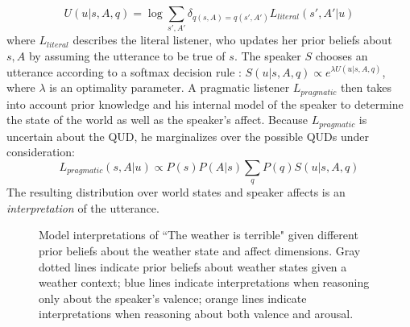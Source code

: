 \documentclass[10pt,letterpaper]{article}
\begin{document}
%
\begin{equation}
U(u | s, A, q) = \log \sum_{s', A'} \delta_{q(s, A)=q(s', A')} L_{literal}(s', A' |u)
\end{equation}
where $L_{literal}$ describes the literal listener, who updates her prior beliefs about $s, A$ by assuming the utterance to be true of $s$. 
The speaker $S$ chooses an utterance according to a softmax decision rule \cite{sutton1998reinforcement}:
$S(u | s, A, q) \propto e^{\lambda U(u | s, A, q)}$,
where $\lambda$ is an optimality parameter.
%
A pragmatic listener $L_{pragmatic}$ then takes into account prior knowledge and his internal model of the speaker to determine the state of the world as well as the speaker's affect. Because $L_{pragmatic}$ is uncertain about the QUD, he marginalizes over the possible QUDs under consideration:
$$
L_{pragmatic}(s, A | u) \propto P(s) P(A | s) \sum_{q}{P (q) S (u|s, A, q)}
$$
%
The resulting distribution over world states and speaker affects is an \emph{interpretation} of the utterance. 

\begin{figure}
\caption{Model interpretations of ``The weather is terrible" given different prior beliefs about the weather state and affect dimensions. Gray dotted lines indicate prior beliefs about weather states given a weather context; blue lines indicate interpretations when reasoning only about the speaker's valence; orange lines indicate interpretations when reasoning about both valence and arousal.}
\label{sim12}
\end{figure}
\end{document}
